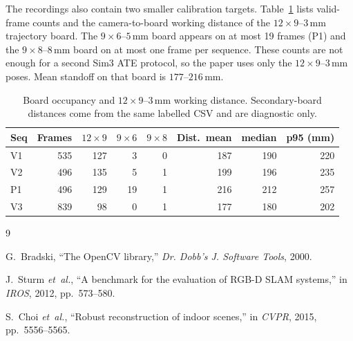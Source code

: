 \documentclass[review]{elsarticle}
\begin{document}
The recordings also contain two smaller calibration targets. Table~\ref{tab:supp_n2_boards} lists valid-frame counts and the camera-to-board working distance of the $12{\times}9$--$3$\,mm trajectory board. The $9{\times}6$--$5$\,mm board appears on at most 19 frames (P1) and the $9{\times}8$--$8$\,mm board on at most one frame per sequence. These counts are not enough for a second Sim3 ATE protocol, so the paper uses only the $12{\times}9$--$3$\,mm poses. Mean standoff on that board is $177$--$216$\,mm.

\begin{table}[h]
\centering
\caption{Board occupancy and $12{\times}9$--$3$\,mm working distance. Secondary-board distances come from the same labelled CSV and are diagnostic only.}
\label{tab:supp_n2_boards}
\setlength{\tabcolsep}{3.5pt}
\renewcommand{\arraystretch}{1.05}
\footnotesize
\begin{tabular}{l rrrr rrr}
\toprule
Seq & Frames & $12{\times}9$ & $9{\times}6$ & $9{\times}8$ & Dist.\ mean & median & p95 (mm) \\
\midrule
V1 & 535 & 127 & 3 & 0 & 187 & 190 & 220 \\
V2 & 496 & 135 & 5 & 1 & 199 & 196 & 235 \\
P1 & 496 & 129 & 19 & 1 & 216 & 212 & 257 \\
V3 & 839 & 98 & 0 & 1 & 177 & 180 & 202 \\
\bottomrule
\end{tabular}
\end{table}


\begin{thebibliography}{9}

G.~Bradski, ``The OpenCV library,'' \emph{Dr. Dobb's J. Software Tools}, 2000.

J.~Sturm \emph{et~al.}, ``A benchmark for the evaluation of RGB-D SLAM systems,'' in \emph{IROS}, 2012, pp.~573--580.

S.~Choi \emph{et~al.}, ``Robust reconstruction of indoor scenes,'' in \emph{CVPR}, 2015, pp.~5556--5565.

\end{thebibliography}
\end{document}
